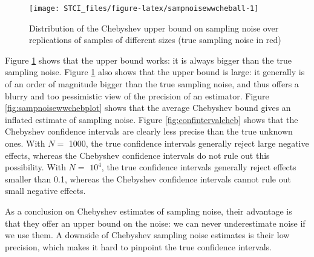 \documentclass[]{book}
\theoremstyle{definition}
\theoremstyle{definition}
\theoremstyle{definition}
\theoremstyle{remark}
\begin{document}
\begin{figure}[htbp]

{\centering \texttt{[image: STCI\_files/figure-latex/sampnoisewwcheball-1]} 

}

\caption{Distribution of the Chebyshev upper bound on sampling noise over replications of samples of different sizes (true sampling noise in red)}\label{fig:sampnoisewwcheball}
\end{figure}

Figure \ref{fig:sampnoisewwcheball} shows that the upper bound works: it is always bigger than the true sampling noise.
Figure \ref{fig:sampnoisewwcheball} also shows that the upper bound is large: it generally is of an order of magnitude bigger than the true sampling noise, and thus offers a blurry and too pessimistic view of the precision of an estimator.
Figure \ref{fig:sampnoisewwchebplot} shows that the average Chebyshev bound gives an inflated estimate of sampling noise.
Figure \ref{fig:confintervalcheb} shows that the Chebyshev confidence intervals are clearly less precise than the true unknown ones.
With \(N=\) 1000, the true confidence intervals generally reject large negative effects, whereas the Chebyshev confidence intervals do not rule out this possibility.
With \(N=\) \ensuremath{10^{4}}, the true confidence intervals generally reject effects smaller than 0.1, whereas the Chebyshev confidence intervals cannot rule out small negative effects.

As a conclusion on Chebyshev estimates of sampling noise, their advantage is that they offer an upper bound on the noise: we can never underestimate noise if we use them.
A downside of Chebyshev sampling noise estimates is their low precision, which makes it hard to pinpoint the true confidence intervals.
\end{document}
